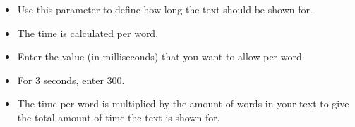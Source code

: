 
\begin{itemize}
\item Use this parameter to define how long the text should be shown for. 
\item The time is calculated per word. 
\item Enter the value (in milliseconds) that you want to allow per word. 
\item For 3 seconds, enter 300.
\item The time per word is multiplied by the amount of words in your text to give the total amount of time the text is shown for. 
\end{itemize}
